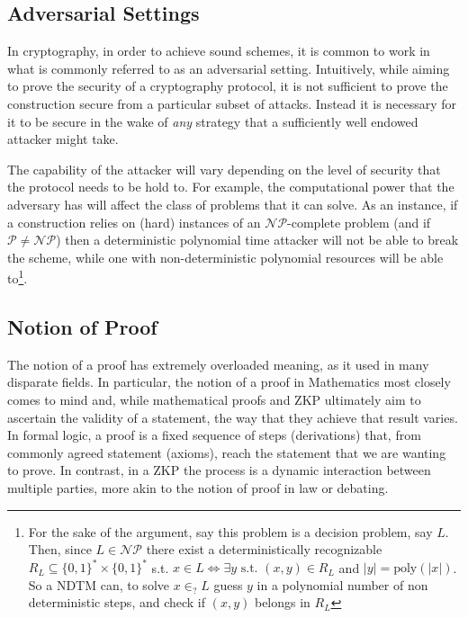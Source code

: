 \documentclass{article}
\begin{document}
\subsection{Adversarial Settings}
In cryptography, in order to achieve sound schemes, it is common to work in what is commonly referred to as an adversarial setting.
Intuitively, while aiming to prove the security of a cryptography protocol, it is not sufficient to prove the construction secure from a particular subset of attacks. Instead it is necessary for it to be secure in the wake of \textit{any} strategy that a sufficiently well endowed attacker might take. \par

The capability of the attacker will vary depending on the level of security that the protocol needs to be hold to. For example, the computational power that the adversary has will affect the class of problems that it can solve.
As an instance, if a construction relies on (hard) instances of an $\mathcal{NP}$-complete problem (and if $\mathcal{P} \neq \mathcal{NP}$) then a deterministic polynomial time attacker will not be able to break the scheme, while one with non-deterministic polynomial resources will be able to\footnote{For the sake of the argument, say this problem is a decision problem, say $L$. Then, since $L \in \mathcal{NP}$ there exist a deterministically recognizable $R_L \subseteq \{0, 1\}^* \times \{0, 1\}^* $ s.t. $x \in L \iff \exists y \text{ s.t. } (x, y) \in R_L$ and $|y| = \text{poly}(|x|)$. So a NDTM can, to solve $x \in_? L$ guess $y$ in a polynomial number of non deterministic steps, and check if $(x, y)$ belongs in $R_L$ }.


\subsection{Notion of Proof}
The notion of a proof has extremely overloaded meaning, as it used in many disparate fields. In particular, the notion of a proof in Mathematics most closely comes to mind and, while mathematical proofs and ZKP ultimately aim to ascertain the validity of a statement, the way that they achieve that result varies. In formal logic, a proof is a fixed sequence of steps (derivations) that, from commonly agreed statement (axioms), reach the statement that we are wanting to prove. In contrast, in a ZKP the process is a dynamic interaction between multiple parties, more akin to the notion of proof in law or debating. 
\end{document}
